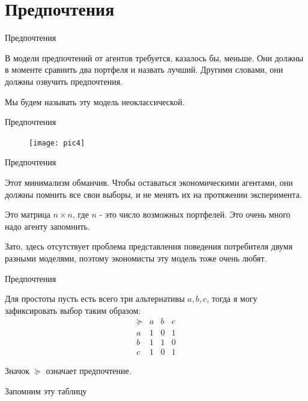 \documentclass{beamer}
\begin{document}
\section{Предпочтения}

\begin{frame}{Предпочтения}

В модели предпочтений от агентов требуется, казалось бы, меньше. Они должны в моменте сравнить два портфеля и назвать лучший. Другими словами, они должны озвучить предпочтения.

Мы будем называть эту модель \alert{неоклассической}.

\end{frame}

\begin{frame}{Предпочтения}

\begin{figure}[hbt]
\centering
\texttt{[image: pic4]}
\end{figure}

\end{frame}

\begin{frame}{Предпочтения}

Этот минимализм обманчив. Чтобы оставаться экономическими агентами, они должны помнить все свои выборы, и не менять их на протяжении эксперимента.

Это матрица $n \times n$, где $n$ - это число возможных портфелей. Это очень много надо агенту запомнить.

Зато, здесь отсутствует проблема представления поведения потребителя двумя разными моделями, поэтому экономисты эту модель тоже очень любят.

\end{frame}

\begin{frame}{Предпочтения}

Для простоты пусть есть всего три альтернативы $a,b,c$, тогда я могу зафиксировать выбор таким образом:
$$\begin{array}{c|ccc}
 \succcurlyeq & a & b & c\\
 \hline
 a & 1 & 0 & 1\\
 b & 1 & 1 & 0\\
 c & 1 & 0 & 1
\end{array}$$

Значок $\succcurlyeq$ означает предпочтение. 

Запомним эту таблицу

\end{frame}
\end{document}
